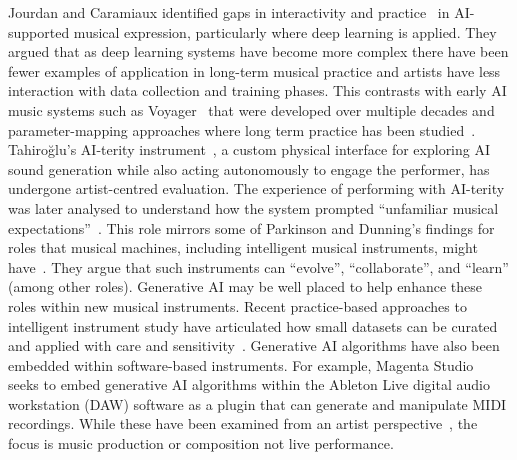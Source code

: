 \documentclass[sigconf]{nimeart}
\begin{document}
Jourdan and Caramiaux identified gaps in interactivity and practice~\cite{jourdan_nime_ml_review} in AI-supported musical expression, particularly where deep learning is applied. 
They argued that as deep learning systems have become more complex there have been fewer examples of application in long-term musical practice and artists have less interaction with data collection and training phases. 
This contrasts with early AI music systems such as Voyager~\cite{Lewis:2000fu} that were developed over multiple decades and parameter-mapping approaches where long term practice has been studied~\cite{fiebrink_years_ml}.
Tahiroğlu's AI-terity instrument~\cite{tahiroglu-aiterity-2021}, a custom physical interface for exploring AI sound generation while also acting autonomously to engage the performer, has undergone  artist-centred evaluation. 
The experience of performing with AI-terity was later analysed to understand how the system prompted ``unfamiliar musical expectations''~\cite{tahirouglu-evolving-2022}.
This role mirrors some of Parkinson and Dunning's findings for roles that musical machines, including intelligent musical instruments, might have~\cite{taxonomy-music-interactions-parkinson-2025}. They argue that such instruments can ``evolve'', ``collaborate'', and ``learn'' (among other roles). Generative AI may be well placed to help enhance these roles within new musical instruments. 
Recent practice-based approaches to intelligent instrument study have articulated how small datasets can be curated and applied with care and sensitivity~\cite{stefansdottir_intelligent_2025}.
Generative AI algorithms have also been embedded within software-based instruments. For example, Magenta Studio~\cite{magenta-studio-2019} seeks to embed generative AI algorithms within the Ableton Live digital audio workstation (DAW) software as a plugin that can generate and manipulate MIDI recordings. While these have been examined from an artist perspective~\cite{Davis:2022}, the focus is music production or composition not live performance.

\end{document}
